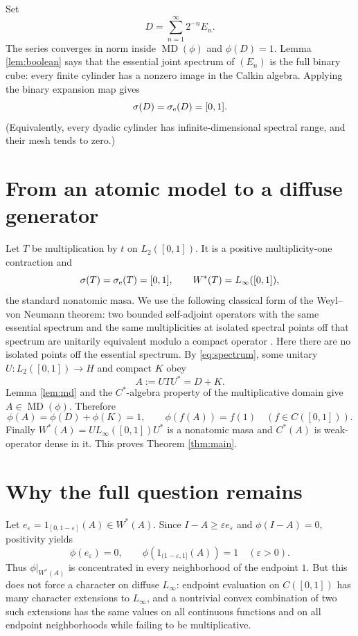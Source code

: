 \documentclass[11pt]{article}
\newcommand{\MD}{\operatorname{MD}}
\begin{document}
Set
\[
 D=\sum_{n=1}^\infty 2^{-n}E_n.
\]
The series converges in norm inside $\MD(\phi)$ and $\phi(D)=1$.  Lemma
\ref{lem:boolean} says that the essential joint spectrum of $(E_n)$ is the
full binary cube: every finite cylinder has a nonzero image in the Calkin
algebra.  Applying the binary expansion map gives
\begin{equation}\label{eq:spectrum}
 \sigma(D)=\sigma_{\rm e}(D)=[0,1].
\end{equation}
(Equivalently, every dyadic cylinder has infinite-dimensional spectral
range, and their mesh tends to zero.)

\section{From an atomic model to a diffuse generator}

Let $T$ be multiplication by $t$ on $L_2([0,1])$.  It is a positive
multiplicity-one contraction and
\[
 \sigma(T)=\sigma_{\rm e}(T)=[0,1],\qquad
 W^*(T)=L_\infty([0,1]),
\]
the standard nonatomic masa.  We use the following classical form of the
Weyl--von Neumann theorem: two bounded self-adjoint operators with the same
essential spectrum and the same multiplicities at isolated spectral points
off that spectrum are unitarily equivalent modulo a compact operator
\cite{Berg}.  Here there are no isolated points off the essential spectrum.
By \eqref{eq:spectrum}, some unitary $U:L_2([0,1])\to H$ and compact $K$ obey
\[
 A:=UTU^*=D+K.
\]
Lemma \ref{lem:md} and the $C^*$-algebra property of the multiplicative domain
give $A\in\MD(\phi)$.  Therefore
\[
 \phi(A)=\phi(D)+\phi(K)=1,
 \qquad \phi(f(A))=f(1)\quad(f\in C([0,1])).
\]
Finally $W^*(A)=U L_\infty([0,1])U^*$ is a nonatomic masa and $C^*(A)$ is
weak-operator dense in it.  This proves Theorem \ref{thm:main}.

\section{Why the full question remains}

Let $e_\varepsilon=1_{[0,1-\varepsilon]}(A)\in W^*(A)$.  Since
$I-A\ge\varepsilon e_\varepsilon$ and $\phi(I-A)=0$, positivity yields
\[
 \phi(e_\varepsilon)=0,
 \qquad
 \phi(1_{(1-\varepsilon,1]}(A))=1
 \quad(\varepsilon>0).
\]
Thus $\phi|_{W^*(A)}$ is concentrated in every neighborhood of the endpoint
$1$.  But this does not force a character on diffuse $L_\infty$: endpoint
evaluation on $C([0,1])$ has many character extensions to $L_\infty$, and a
nontrivial convex combination of two such extensions has the same values on
all continuous functions and on all endpoint neighborhoods while failing to
be multiplicative.
\end{document}
